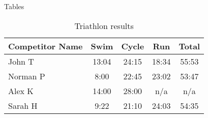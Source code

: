 \documentclass{beamer}
\begin{document}
  
\begin{frame}{Tables}
  \begin{table}
  \begin{tabular}{l | c | c | c | c }
  Competitor Name & Swim & Cycle & Run & Total \\
  \hline \hline
  John T & 13:04 & 24:15 & 18:34 & 55:53  \\ 
  Norman P & 8:00 & 22:45 & 23:02 & 53:47 \\
  Alex K & 14:00 & 28:00 & n/a & n/a \\
  Sarah H & 9:22 & 21:10 & 24:03 & 54:35 
  \end{tabular}
  \caption{Triathlon results}
  \end{table}
\end{frame}
\end{document}
